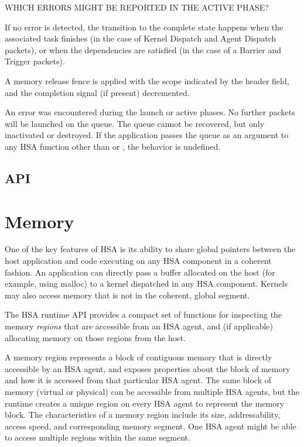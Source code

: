 \documentclass[final,oneside]{book}
\begin{document}
\begin{description}[itemsep=2pt,leftmargin=0cm, labelindent=0cm]
  {\color{red}WHICH ERRORS MIGHT BE REPORTED IN THE ACTIVE PHASE?}

  If no error is detected, the transition to the complete state happens when the
  associated task finishes (in the case of Kernel Dispatch and Agent Dispatch
  packets), or when the dependencies are satisfied (in the case of a Barrier and
  Trigger packets).

\item[Complete] A memory release fence is applied with the scope indicated by
  the  header field, and the
  completion signal (if present) decremented.

\item[Error] An error was encountered during the launch or active phases. No
  further packets will be launched on the queue. The queue cannot be recovered,
  but only inactivated or destroyed. If the application passes the queue as an
  argument to any HSA function other than  or
  , the behavior is undefined.

\end{description}

\subsection{API}


\section{Memory}\label{sec:memory}

One of the key features of HSA is its ability to share global pointers between
the host application and code executing on any HSA component in a coherent
fashion. An application can directly pass a buffer allocated on the host (for
example, using malloc) to a kernel dispatched in any HSA component. Kernels may
also access memory that is not in the coherent, global segment.

The HSA runtime API provides a compact set of functions for inspecting the
memory \emph{regions} that are accessible from an HSA agent, and (if applicable)
allocating memory on those regions from the host.

A memory region represents a block of contiguous memory that is directly
accessible by an HSA agent, and exposes properties about the block of memory and
how it is accessed from that particular HSA agent. The same block of memory
(virtual or physical) can be accessible from multiple HSA agents, but the
runtime creates a unique region on every HSA agent to represent the memory
block. The characteristics of a memory region include its size, addressability,
access speed, and corresponding memory segment. One HSA agent might be able to
access multiple regions within the same segment.
\end{document}
